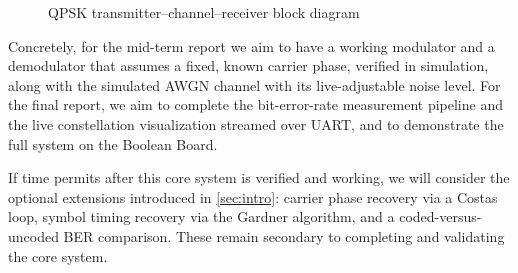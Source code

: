 \documentclass[10pt,twocolumn,letterpaper]{article}
\begin{document}
\begin{figure}[h]
   \caption{QPSK transmitter–channel–receiver block diagram}
   \label{fig:onecol}
\end{figure}
Concretely, for the mid-term report we aim to have a working
modulator and a demodulator that assumes a fixed, known carrier phase,
verified in simulation, along with the simulated AWGN channel with its
live-adjustable noise level. For the final report, we aim to complete
the bit-error-rate measurement pipeline and the live constellation
visualization streamed over UART, and to demonstrate the full system
on the Boolean Board.

If time permits after this core system is verified and working, we
will consider the optional extensions introduced in
\cref{sec:intro}: carrier phase recovery via a Costas loop, symbol
timing recovery via the Gardner algorithm, and a coded-versus-uncoded
BER comparison. These remain secondary to completing and validating
the core system.

{\small


}
\end{document}

